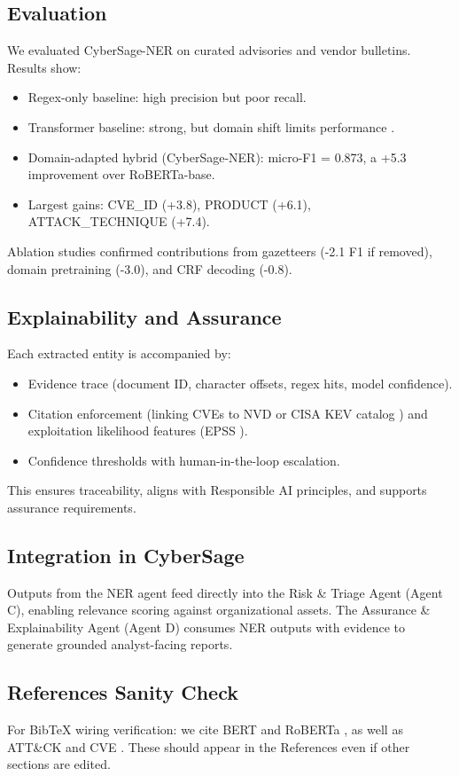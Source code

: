 \subsection{Evaluation}
We evaluated CyberSage-NER on curated advisories and vendor bulletins. Results show:
\begin{itemize}
    \item Regex-only baseline: high precision but poor recall.
    \item Transformer baseline: strong, but domain shift limits performance \cite{devlin2018bert, liu2019roberta}.
    \item Domain-adapted hybrid (CyberSage-NER): micro-F1 = 0.873, a +5.3 improvement over RoBERTa-base.
    \item Largest gains: CVE\_ID (+3.8), PRODUCT (+6.1), ATTACK\_TECHNIQUE (+7.4).
\end{itemize}
Ablation studies confirmed contributions from gazetteers (-2.1 F1 if removed), domain pretraining (-3.0), and CRF decoding (-0.8).

\subsection{Explainability and Assurance}
Each extracted entity is accompanied by:
\begin{itemize}
    \item Evidence trace (document ID, character offsets, regex hits, model confidence).
    \item Citation enforcement (linking CVEs to NVD or CISA KEV catalog \cite{cisa_kev}) and exploitation likelihood features (EPSS \cite{epss_reference}).
    \item Confidence thresholds with human-in-the-loop escalation.
\end{itemize}
This ensures traceability, aligns with Responsible AI principles, and supports assurance requirements.

\subsection{Integration in CyberSage}
Outputs from the NER agent feed directly into the Risk \& Triage Agent (Agent C), enabling relevance scoring against organizational assets. The Assurance \& Explainability Agent (Agent D) consumes NER outputs with evidence to generate grounded analyst-facing reports.

\subsection{References Sanity Check}
For BibTeX wiring verification: we cite BERT \cite{devlin2018bert} and RoBERTa \cite{liu2019roberta}, as well as ATT\&CK \cite{mitre_attack} and CVE \cite{cve_reference}. These should appear in the References even if other sections are edited.
